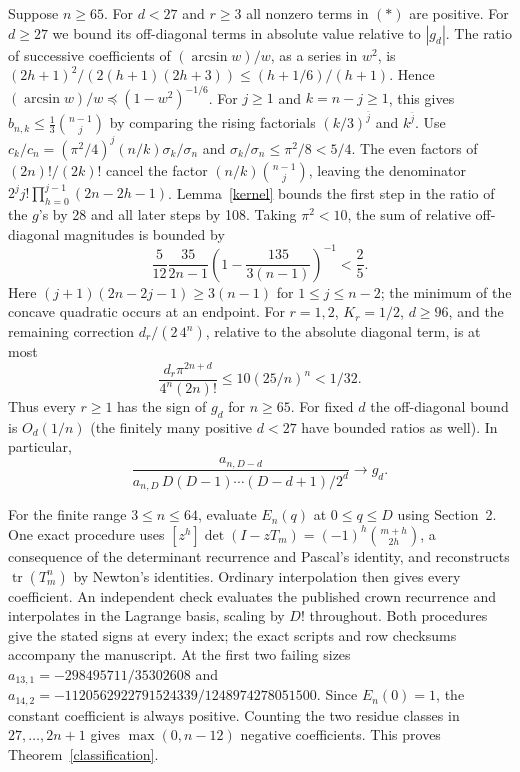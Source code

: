 \documentclass[11pt]{article}
\newcommand{\tr}{\operatorname{tr}}
\begin{document}
Suppose \(n\ge65\). For \(d<27\) and \(r\ge3\) all nonzero terms in
\((*)\) are positive. For \(d\ge27\) we bound its off-diagonal terms
in absolute value relative to \(|g_d|\). The ratio of successive coefficients
of \((\arcsin w)/w\), as a series in \(w^2\), is
\((2h+1)^2/(2(h+1)(2h+3))\le(h+1/6)/(h+1)\). Hence
\((\arcsin w)/w\preceq(1-w^2)^{-1/6}\). For \(j\ge1\) and \(k=n-j\ge1\),
this gives \(b_{n,k}\le \tfrac13\binom{n-1}{j}\) by comparing the
rising factorials \((k/3)^{\overline j}\) and \(k^{\overline j}\).
Use \(c_k/c_n=(\pi^2/4)^j(n/k)\sigma_k/\sigma_n\) and
\(\sigma_k/\sigma_n\le\pi^2/8<5/4\).
The even factors of \((2n)!/(2k)!\) cancel the factor
\((n/k)\binom{n-1}{j}\), leaving the denominator
\(2^j j!\prod_{h=0}^{j-1}(2n-2h-1)\).
Lemma~\ref{kernel} bounds the first step in the ratio of the \(g\)'s by 28
and all later steps by 108. Taking \(\pi^2<10\), the sum of relative
off-diagonal magnitudes is bounded by
\[
 \frac5{12}\frac{35}{2n-1}
 \left(1-\frac{135}{3(n-1)}\right)^{-1}<\frac25 .
\]
Here \((j+1)(2n-2j-1)\ge3(n-1)\) for \(1\le j\le n-2\);
the minimum of the concave quadratic occurs at an endpoint.
For \(r=1,2\), \(K_r=1/2\), \(d\ge96\), and the remaining correction
\(d_r/(2\,4^n)\), relative to the absolute diagonal term, is at most
\[
 \frac{d_r\pi^{2n+d}}{4^n(2n)!}\le10(25/n)^n<1/32.
\]
Thus every \(r\ge1\) has the sign of \(g_d\) for \(n\ge65\).
For fixed \(d\) the off-diagonal bound is \(O_d(1/n)\) (the finitely many
positive \(d<27\) have bounded ratios as well). In particular,
\[
 \frac{a_{n,D-d}}{a_{n,D}\,D(D-1)\cdots(D-d+1)/2^d}\longrightarrow g_d .
\]

For the finite range \(3\le n\le64\), evaluate \(E_n(q)\) at
\(0\le q\le D\) using Section~2. One exact procedure uses
\([z^h]\det(I-zT_m)=(-1)^h\binom{m+h}{2h}\), a consequence of
the determinant recurrence and Pascal's identity, and reconstructs
\(\tr(T_m^n)\) by Newton's identities. Ordinary interpolation then
gives every coefficient. An independent check evaluates the published
crown recurrence and interpolates in the Lagrange basis, scaling by
\(D!\) throughout. Both procedures give the stated signs at every
index; the exact scripts and row checksums accompany the manuscript.
At the first two failing sizes \(a_{13,1}=-298495711/35302608\) and
\(a_{14,2}=-1120562922791524339/1248974278051500\).
Since \(E_n(0)=1\), the constant coefficient is always positive.
Counting the two residue classes in \(27,\ldots,2n+1\) gives
\(\max(0,n-12)\) negative coefficients. This proves Theorem~\ref{classification}.
\end{document}
